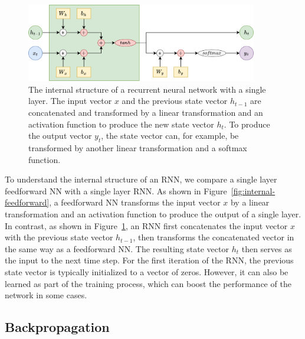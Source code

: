 \documentclass{article}
\newcommand{\reffig}[1]{Figure~\ref{#1}}
\begin{document}
\begin{figure}[htbp]
  \centering
  \includegraphics[width=0.9\textwidth]{Block Diagram RNN.drawio.png}
  \caption{The internal structure of a recurrent neural network with a single layer. The
    input vector $x$ and the previous state vector $h_{t-1}$ are concatenated and
    transformed by a linear transformation and an activation function to produce the new
    state vector $h_t$. To produce the output vector $y_t$, the state vector can, for
    example, be transformed by another linear transformation and a softmax function.}
  \label{fig:internal-rnn}
\end{figure}

To understand the internal structure of an RNN, we compare a single layer feedforward NN
with a single layer RNN. As shown in \reffig{fig:internal-feedforward}, a feedforward NN
transforms the input vector $x$ by a linear transformation and an activation function to
produce the output of a single layer. In contrast, as shown in \reffig{fig:internal-rnn},
an RNN first concatenates the input vector $x$ with the previous state vector $h_{t-1}$,
then transforms the concatenated vector in the same way as a feedforward NN. The resulting
state vector $h_t$ then serves as the input to the next time step. For the first iteration
of the RNN, the previous state vector is typically initialized to a vector of zeros.
However, it can also be learned as part of the training process, which can boost the
performance of the network in some cases.


\subsection{Backpropagation}
\label{sec:2.2}
\end{document}
